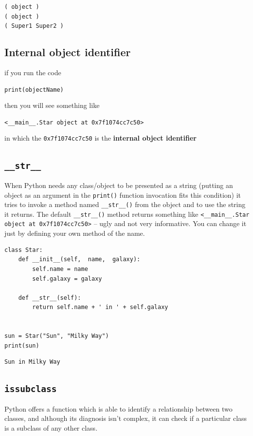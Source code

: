 \documentclass[11pt]{article}
\begin{document}
\begin{verbatim}
( object )
( object )
( Super1 Super2 )
\end{verbatim}
\subsection{Internal object identifier}
\label{sec:org5c91e4b}
if you run the code 

\texttt{print(objectName)}

then you will see something like

\texttt{<\_\_main\_\_.Star object at 0x7f1074cc7c50>}

in which the \texttt{0x7f1074cc7c50} is the \textbf{internal object identifier}

\subsection{\texttt{\_\_str\_\_}}
\label{sec:orgf555569}
When Python needs any class/object to be presented as a string
(putting an object as an argument in the \texttt{print()} function invocation
fits this condition) it tries to invoke a method named \texttt{\_\_str\_\_()}
from the object and to use the string it returns. The default
\texttt{\_\_str\_\_()} method returns something like \texttt{<\_\_main\_\_.Star object at
0x7f1074cc7c50>} – ugly and not very informative. You can change it
just by defining your own method of the name.

\begin{verbatim}
class Star:
	def __init__(self,  name,  galaxy):
		self.name = name
		self.galaxy = galaxy

	def __str__(self):
		return self.name + ' in ' + self.galaxy


sun = Star("Sun", "Milky Way")
print(sun)

\end{verbatim}

\begin{verbatim}
Sun in Milky Way
\end{verbatim}
\newpage

\subsection{\texttt{issubclass}}
\label{sec:orgd0cb2e7}
Python offers a function which is able to identify a relationship
between two classes, and although its diagnosis isn’t complex, it can
check if a particular class is a subclass of any other class.
\end{document}
